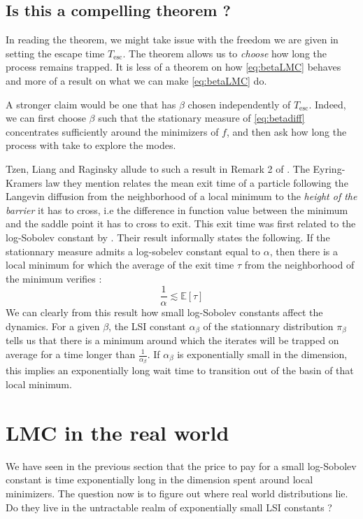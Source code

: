\documentclass[11pt,twoside]{article}
\theoremstyle{definition}
\newcommand{\E}{\mathbb{E}}
\begin{document}
\subsection{Is this a compelling theorem ?}

In reading the theorem, we might take issue with the freedom we are given in setting the escape time $T_{\text{esc}}$. The theorem allows us to \emph{choose} how long the process remains trapped. It is less of a theorem on how \eqref{eq:betaLMC} behaves and more of a result on what we can make \eqref{eq:betaLMC} do.

A stronger claim would be one that has $\beta$ chosen independently of $T_{\text{esc}}$. Indeed, we can first choose $\beta$ such that the stationary measure of \eqref{eq:betadiff} concentrates sufficiently around the minimizers of $f$, and then ask how long the process with take to explore the modes.

Tzen, Liang and Raginsky allude to such a result in Remark 2 of \cite{tzen_local_2018}. The Eyring-Kramers law they mention relates the mean exit time of a particle following the Langevin diffusion from the neighborhood of a local minimum to the \textit{height of the barrier} it has to cross, i.e the difference in function value between the minimum and the saddle point it has to cross to exit. This exit time was first related to the log-Sobolev constant by \cite{menz_poincare_2014-1}. Their result informally states the following. If the stationnary measure admits a log-sobelev constant equal to $\alpha$, then there is a local minimum for which the average of the exit time $\tau$ from the neighborhood of the minimum verifies :
\[
    \frac{1}{\alpha} \lesssim \E[\tau]
\]
We can clearly from this result how small log-Sobolev constants affect the dynamics. For a given $\beta$, the LSI constant $\alpha_\beta$ of the stationnary distribution $\pi_\beta$ tells us that there is a minimum around which the iterates will be trapped on average for a time longer than $\frac{1}{\alpha_\beta}$. If $\alpha_\beta$ is exponentially small in the dimension, this implies an exponentially long wait time to transition out of the basin of that local minimum.

\section{LMC in the real world}

We have seen in the previous section that the price to pay for a small log-Sobolev constant is time exponentially long in the dimension spent around local minimizers. The question now is to figure out where real world distributions lie. Do they live in the untractable realm of exponentially small LSI constants ?
\end{document}
